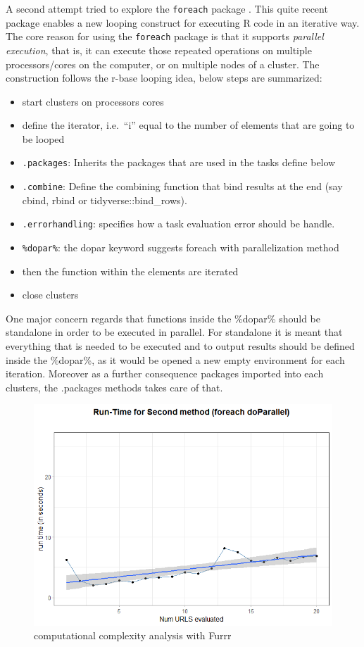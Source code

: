 \documentclass[
  12pt,
  a4paper,
  oneside]{book}
\providecommand{\tightlist}{%
  \setlength{\itemsep}{0pt}\setlength{\parskip}{0pt}}
\theoremstyle{definition}
\theoremstyle{definition}
\theoremstyle{definition}
\theoremstyle{remark}
\begin{document}
A second attempt tried to explore the \texttt{foreach} package \citep{foreach}. This quite recent package enables a new looping construct for executing R code in an iterative way. The core reason for using the \texttt{foreach} package is that it supports \emph{parallel execution}, that is, it can execute those repeated operations on multiple processors/cores on the computer, or on multiple nodes of a cluster. The construction follows the r-base looping idea, below steps are summarized:

\begin{itemize}
\tightlist
\item
  start clusters on processors cores
\item
  define the iterator, i.e.~``i'' equal to the number of elements that are going to be looped
\item
  \texttt{.packages}: Inherits the packages that are used in the tasks define below
\item
  \texttt{.combine}: Define the combining function that bind results at the end (say cbind, rbind or tidyverse::bind\_rows).
\item
  \texttt{.errorhandling}: specifies how a task evaluation error should be handle.
\item
  \texttt{\%dopar\%}: the dopar keyword suggests foreach with parallelization method
\item
  then the function within the elements are iterated
\item
  close clusters
\end{itemize}

One major concern regards that functions inside the \%dopar\% should be standalone in order to be executed in parallel. For standalone it is meant that everything that is needed to be executed and to output results should be defined inside the \%dopar\%, as it would be opened a new empty environment for each iteration. Moreover as a further consequence packages imported into each clusters, the .packages methods takes care of that.

\begin{figure}
\centering
\includegraphics{images/run_timeforeach.png}
\caption{computational complexity analysis with Furrr}
\end{figure}
\end{document}
